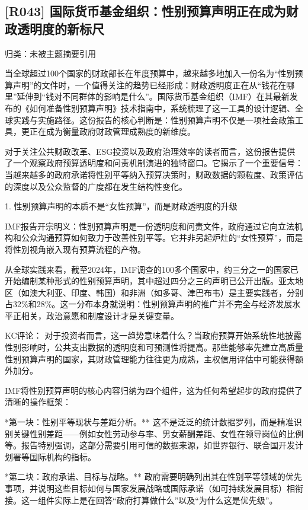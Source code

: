 \documentclass[11pt]{ctexart}
\begin{document}
\subsection{[R043] 国际货币基金组织：性别预算声明正在成为财政透明度的新标尺}
{\small\color{refgray}归类：未被主题摘要引用}

当全球超过100个国家的财政部长在年度预算中，越来越多地加入一份名为“性别预算声明”的文件时，一个值得关注的趋势已经形成：财政透明度正在从“钱花在哪里”延伸到“钱对不同群体的影响是什么”。国际货币基金组织（IMF）在其最新发布的《如何准备性别预算声明》技术指南中，系统梳理了这一工具的设计逻辑、全球实践与实施路径。这份报告的核心判断是：性别预算声明不仅是一项社会政策工具，更正在成为衡量政府财政管理成熟度的新维度。

对于关注公共财政改革、ESG投资以及政府治理效率的读者而言，这份报告提供了一个观察政府预算透明度和问责机制演进的独特窗口。它揭示了一个重要信号：当越来越多的政府承诺将性别平等纳入预算决策时，财政数据的颗粒度、政策评估的深度以及公众监督的广度都在发生结构性变化。

1. 性别预算声明的本质不是“女性预算”，而是财政透明度的升级

IMF报告开宗明义：性别预算声明是一份透明度和问责文件，政府通过它向立法机构和公众沟通预算如何致力于改善性别平等。它并非另起炉灶的“女性预算”，而是将性别视角嵌入现有预算流程的产物。

从全球实践来看，截至2024年，IMF调查的100多个国家中，约三分之一的国家已开始编制某种形式的性别预算声明，其中超过四分之三的声明已公开出版。亚太地区（如澳大利亚、印度、韩国）和非洲（如多哥、津巴布韦）是主要实践者，分别占32\%和28\%。这一分布本身就说明：性别预算声明的推广并不完全与经济发展水平正相关，政治意愿和制度设计才是关键变量。

KC评论： 对于投资者而言，这一趋势意味着什么？当政府预算开始系统性地披露性别影响时，公共支出数据的透明度和可预测性将提高。那些能够率先建立高质量性别预算声明的国家，其财政管理能力往往更为成熟，主权信用评估中可能获得额外加分。

IMF将性别预算声明的核心内容归纳为四个组件，这为任何希望起步的政府提供了清晰的操作框架：

*第一块：性别平等现状与差距分析。** 这不是泛泛的统计数据罗列，而是精准识别关键性别差距——例如女性劳动参与率、男女薪酬差距、女性在领导岗位的比例等。报告特别强调，这部分需要引用可信的数据来源，如世界银行、联合国开发计划署等国际机构的指标。

*第二块：政府承诺、目标与战略。** 政府需要明确列出其在性别平等领域的优先事项，并说明这些目标如何与国家发展战略或国际承诺（如可持续发展目标）相衔接。这一组件实际上是在回答“政府打算做什么”以及“为什么这是优先级”。
\end{document}
